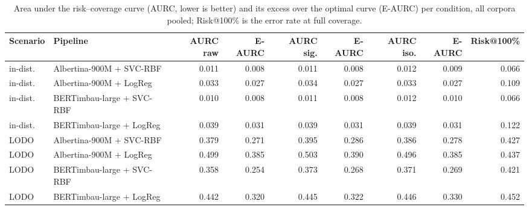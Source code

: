 \begin{table}[t]
\centering
\small
\caption{Area under the risk--coverage curve (AURC, lower is better) and its excess over the optimal curve (E-AURC) per condition, all corpora pooled; Risk@100\% is the error rate at full coverage.}
\label{tab:selective-aurc}
\begin{tabular}{llrrrrrrr}
\toprule
Scenario & Pipeline & AURC raw & E-AURC & AURC sig. & E-AURC & AURC iso. & E-AURC & Risk@100\% \\
\midrule
in-dist. & Albertina-900M + SVC-RBF & 0.011 & 0.008 & 0.011 & 0.008 & 0.012 & 0.009 & 0.066 \\
in-dist. & Albertina-900M + LogReg & 0.033 & 0.027 & 0.034 & 0.027 & 0.033 & 0.027 & 0.109 \\
in-dist. & BERTimbau-large + SVC-RBF & 0.010 & 0.008 & 0.011 & 0.008 & 0.012 & 0.010 & 0.066 \\
in-dist. & BERTimbau-large + LogReg & 0.039 & 0.031 & 0.039 & 0.031 & 0.039 & 0.031 & 0.122 \\
LODO & Albertina-900M + SVC-RBF & 0.379 & 0.271 & 0.395 & 0.286 & 0.386 & 0.278 & 0.427 \\
LODO & Albertina-900M + LogReg & 0.499 & 0.385 & 0.503 & 0.390 & 0.496 & 0.385 & 0.437 \\
LODO & BERTimbau-large + SVC-RBF & 0.358 & 0.254 & 0.373 & 0.268 & 0.371 & 0.269 & 0.421 \\
LODO & BERTimbau-large + LogReg & 0.442 & 0.320 & 0.445 & 0.322 & 0.446 & 0.330 & 0.452 \\
\bottomrule
\end{tabular}
\end{table}
